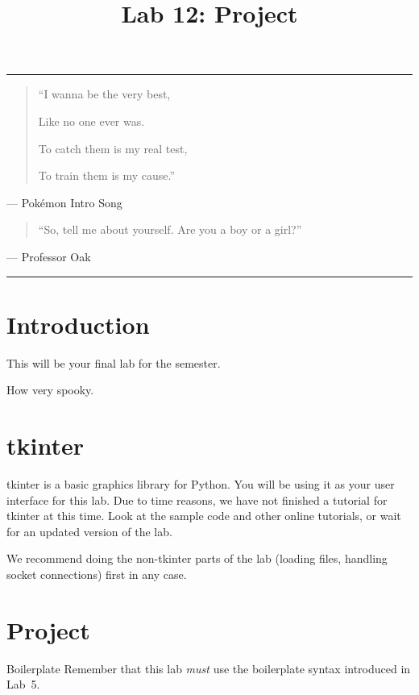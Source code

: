 \documentclass[11pt]{cselabheader}
\title{Lab 12: Project}
\begin{document}
\maketitle

\hrule
\begin{quotation}
  ``I wanna be the very best,
  
  Like no one ever was.
  
  To catch them is my real test,
  
  To train them is my cause.''
\end{quotation}
\begin{flushright}
--- Pok\'emon Intro Song
\end{flushright}


\begin{quotation}
``So, tell me about yourself. Are you a boy or a girl?''
\end{quotation}
\begin{flushright}
--- Professor Oak
\end{flushright}

\hrule

\section{Introduction}
This will be your final lab for the semester.

\vspace{3in}
How very spooky.


\pagebreak

\section{tkinter}
\label{sec:tk}
tkinter is a basic graphics library for Python. You will be using it as your
user interface for this lab. Due to time reasons, we have not finished a
tutorial for tkinter at this time. Look at the sample code and other online
tutorials, or wait for an updated version of the lab.

We recommend doing the non-tkinter parts of the lab (loading files, handling
socket connections) first in any case.

\pagebreak

\section{Project}
\label{sec:proj}

\begin{warningbox}{Boilerplate}
  Remember that this lab \emph{must} use the
  boilerplate syntax introduced in Lab~5.
\end{warningbox}
\end{document}
